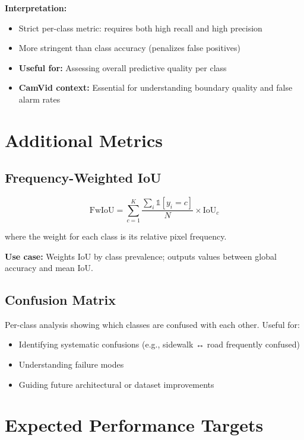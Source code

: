 \documentclass[11pt,a4paper]{report}
\begin{document}
\textbf{Interpretation:}
\begin{itemize}
  \item Strict per-class metric: requires both high recall and high precision
  \item More stringent than class accuracy (penalizes false positives)
  \item \textbf{Useful for:} Assessing overall predictive quality per class
  \item \textbf{CamVid context:} Essential for understanding boundary quality and false alarm rates
\end{itemize}

\section{Additional Metrics}

\subsection{Frequency-Weighted IoU}

\begin{equation}
\text{FwIoU} = \sum_{c=1}^{K} \frac{\sum_i \mathbb{1}[y_i = c]}{N} \times \text{IoU}_c
\end{equation}

where the weight for each class is its relative pixel frequency.

\textbf{Use case:} Weights IoU by class prevalence; outputs values between global accuracy and mean IoU.

\subsection{Confusion Matrix}

Per-class analysis showing which classes are confused with each other. Useful for:
\begin{itemize}
  \item Identifying systematic confusions (e.g., sidewalk ↔ road frequently confused)
  \item Understanding failure modes
  \item Guiding future architectural or dataset improvements
\end{itemize}

\section{Expected Performance Targets}
\end{document}
